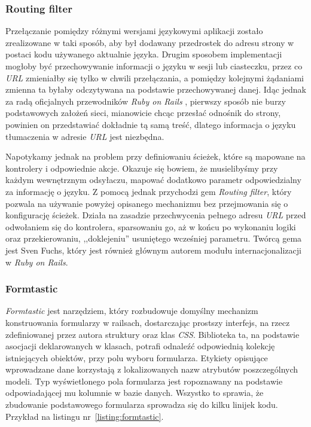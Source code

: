 \documentclass[a4paper,12pt]{article}
\begin{document}
\subsubsection{Routing filter}
Przełączanie pomiędzy różnymi wersjami językowymi aplikacji zostało zrealizowane w taki
sposób, aby był dodawany przedrostek do adresu strony w postaci kodu używanego aktualnie
języka. Drugim sposobem implementacji mogłoby być przechowywanie informacji o języku w sesji
lub ciasteczku, przez co \emph{URL} zmieniałby się tylko w chwili przełączania, a pomiędzy
kolejnymi żądaniami zmienna ta byłaby odczytywana na podstawie przechowywanej danej.
Idąc jednak za radą oficjalnych przewodników \emph{Ruby on Rails} \cite{rails-guides},
pierwszy sposób nie burzy podstawowych założeń sieci, mianowicie chcąc przesłać odnośnik
do strony, powinien on przedstawiać dokładnie tą samą treść, dlatego informacja o języku
tłumaczenia w adresie \emph{URL} jest niezbędna.


Napotykamy jednak na problem przy definiowaniu ścieżek, które są mapowane na kontrolery i
odpowiednie akcje. Okazuje się bowiem, że musielibyśmy przy każdym wewnętrznym odsyłaczu,
mapować dodatkowo parametr odpowiedzialny za informację o języku. Z pomocą jednak
przychodzi gem \emph{Routing filter}, który pozwala na używanie powyżej opisanego
mechanizmu bez przejmowania się o konfigurację ścieżek. Działa na zasadzie przechwycenia
pełnego adresu \emph{URL} przed odwołaniem się do kontrolera, sparsowaniu go, aż w końcu
po wykonaniu logiki oraz przekierowaniu, ,,doklejeniu'' usuniętego wcześniej parametru.
Twórcą gema jest Sven Fuchs, który jest również głównym autorem modułu internacjonalizacji
w \emph{Ruby on Rails}.

\subsubsection{Formtastic}
\emph{Formtastic} jest narzędziem, który rozbudowuje domyślny mechanizm konstruowania
formularzy w railsach, dostarczając prostszy interfejs, na rzecz zdefiniowanej przez
autora struktury oraz klas \emph{CSS}. Biblioteka ta, na podstawie asocjacji deklarowanych
w klasach, potrafi odnaleźć odpowiednią kolekcję istniejących obiektów, przy polu wyboru
formularza. Etykiety opisujące wprowadzane dane korzystają z lokalizowanych nazw atrybutów
poszczególnych modeli. Typ wyświetlonego pola formularza jest ropoznawany na podstawie
odpowiadającej mu kolumnie w bazie danych. Wszystko to sprawia, że zbudowanie podstawowego
formularza sprowadza się do kilku linijek kodu. Przykład na listingu
nr~\ref{listing:formtastic}.
\end{document}
